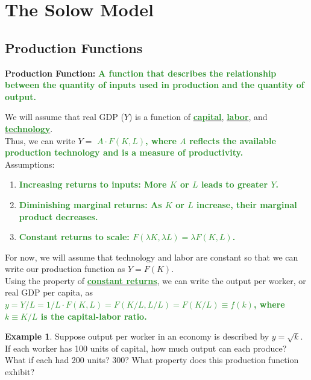 \documentclass[11pt]{article}\usepackage[]{graphicx}\usepackage[]{color}
\theoremstyle{definition}
\newtheorem{exmp}{Example}[section]
\newcommand{\ddp}[1]{{\textbf{\textcolor{ForestGreen}{#1}}}}
\newcommand{\dd}[1]{{\underline{\textbf{\textcolor{ForestGreen}{#1}}}}}
\newcommand{\defn}[1]{\textbf{#1}}
\begin{document}
\newpage

\section{The Solow Model}


\subsection{Production Functions}

\defn{Production Function:} \ddp{A function that describes the relationship between the quantity of inputs used in production and the quantity of output.\\}

We will assume that real GDP ($Y$) is a function of \dd{capital}, \dd{labor}, and \dd{technology}. 
\\

Thus, we can write $Y =$ \ddp{$A\cdot F(K,L)$, where $A$ reflects the available production technology and is a measure of productivity.}
\\

Assumptions:
\begin{enumerate}
	\setlength{\itemsep}{1em}
	\item \ddp{Increasing returns to inputs: More $K$ or $L$ leads to greater $Y$.}
	\item \ddp{Diminishing marginal returns: As $K$ or $L$ increase, their marginal product decreases.}
	\item \ddp{Constant returns to scale: $F(\lambda K, \lambda L) = \lambda F(K,L)$.}
\end{enumerate}

For now, we will assume that technology and labor are constant so that we can write our production function as $Y = F(K)$.
\\

Using the property of \dd{constant returns}, we can write the output per worker, or real GDP per capita, as \ddp{$y = Y/L = 1/L \cdot F(K,L) = F(K/L,L/L) = F(K/L) \equiv f(k)$, where $k \equiv K/L$ is the capital-labor ratio.}
\\

\begin{exmp} 
	Suppose output per worker in an economy is described by $y = \sqrt{k}$. If each worker has 100 units of capital, how much output can each produce? What if each had 200 units? 300? What property does this production function exhibit?
\end{exmp}
\end{document}
